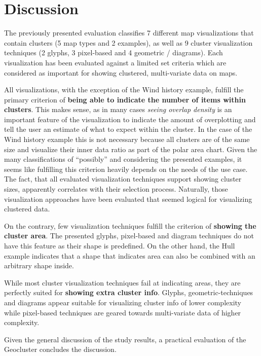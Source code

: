 

\chapter{Discussion}

The previously presented evaluation classifies 7 different map visualizations that contain clusters (5 map types and 2 examples), as well as 9 cluster visualization techniques (2 glyphs, 3 pixel-based and 4 geometric / diagrams). Each visualization has been evaluated against a limited set criteria which are considered as important for showing clustered, multi-variate data on maps.

All visualizations, with the exception of the Wind history example, fulfill the primary criterion of \textbf{being able to indicate the number of items within clusters}. This makes sense, as in many cases \textit{seeing overlap density} is an important feature of the visualization to indicate the amount of overplotting and tell the user an estimate of what to expect within the cluster. In the case of the Wind history example this is not necessary because all clusters are of the same size and visualize their inner data ratio as part of the polar area chart. Given the many classifications of ``possibly'' and considering the presented examples, it seems like fulfilling this criterion heavily depends on the needs of the use case. The fact, that all evaluated visualization techniques support showing cluster sizes, apparently correlates with their selection process. Naturally, those visualization approaches have been evaluated that seemed logical for visualizing clustered data. 

On the contrary, few visualization techniques fulfill the criterion of \textbf{showing the cluster area}. The presented glyphs, pixel-based and diagram techniques do not have this feature as their shape is predefined. On the other hand, the Hull example indicates that a shape that indicates area can also be combined with an arbitrary shape inside.

While most cluster visualization techniques fail at indicating areas, they are perfectly suited for \textbf{showing extra cluster info}. Glyphs, geometric-techniques and diagrams appear suitable for visualizing cluster info of lower complexity while pixel-based techniques are geared towards multi-variate data of higher complexity.


Given the general discussion of the study results, a practical evaluation of the Geocluster concludes the discussion.

